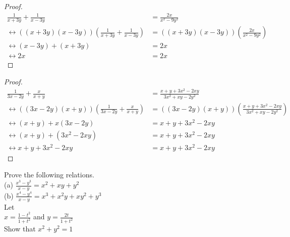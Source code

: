 \begin{proof}
\begin{align*}
\frac{1}{x + 3y} + \frac{1}{x - 3y} &= \frac{2x}{x^2 - 9y^2} && \\
\leftrightarrow \left((x + 3y)(x - 3y)\right)\left(\frac{1}{x + 3y} + \frac{1}{x - 3y}\right)
    &= \left((x + 3y)(x - 3y)\right)\left(\frac{2x}{x^2 - 9y^2}\right) && \\
\leftrightarrow (x - 3y) + (x + 3y) &= 2x && \\
\leftrightarrow 2x &= 2x 
\end{align*}
\end{proof}
\begin{proof}
\begin{align*}
\frac{1}{3x - 2y} + \frac{x}{x + y} &= \frac{x + y + 3x^2 - 2xy}{3x^2 + xy - 2y^2} && \\
\leftrightarrow \left((3x - 2y)(x + y)\right)\left(\frac{1}{3x - 2y} + \frac{x}{x + y}\right)
    &= \left((3x - 2y)(x + y)\right)\left(\frac{x + y + 3x^2 - 2xy}{3x^2 + xy - 2y^2}\right) && \\
\leftrightarrow (x + y) + x(3x-2y) &= x + y + 3x^2 - 2xy && \\
\leftrightarrow (x + y) + (3x^2 - 2xy) &= x + y + 3x^2 - 2xy && \\
\leftrightarrow x + y + 3x^2 - 2xy &= x + y + 3x^2 - 2xy
\end{align*}
\end{proof}


\begin{tcolorbox}[title=Problem 4, breakable]
Prove the following relations. \\
(a) $\frac{x^3 - y^3}{x - y} = x^2 + xy + y^2$ \\
(b) $\frac{x^4 - y^4}{x - y} = x^3 + x^2y + xy^2 + y^3$ \\
Let \\
$x = \frac{1 - t^2}{1 + t^2}$ and $y = \frac{2t}{1 + t^2}$ \\
Show that $x^2 + y^2 = 1$
\end{tcolorbox}

